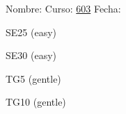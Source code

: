 \documentclass[landscape,10pt]{article}
\title{}
\author{Germán Avendaño Ramírez}
\begin{document}
Nombre: \hrulefill Curso: \underline{603} Fecha: \underline{\hspace{100pt}}
\vspace{25pt}

\cluefont{\Large}
\begin{minipage}{0.95\linewidth}\begin{center}
SE25 (easy) \\
\end{center}\end{minipage} 

\vspace*{20pt}
\begin{minipage}{0.95\linewidth}\begin{center}
SE30 (easy) \\
\end{center}\end{minipage} 

\begin{minipage}{0.95\linewidth}\begin{center}
TG5 (gentle) \\
\end{center}\end{minipage}

\vspace*{20pt}
\begin{minipage}{0.95\linewidth}\begin{center}
TG10 (gentle) \\
\end{center}\end{minipage}
\end{document}
